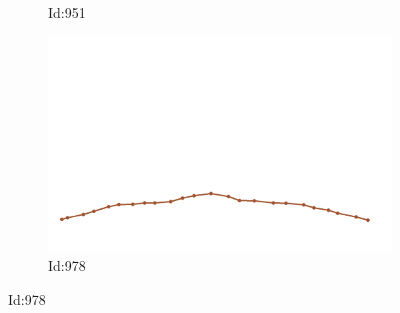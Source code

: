 \documentclass[12pt,twoside]{report}
\begin{document}
\begin{figure}
\begin{subfigure}[b]{0.20\textwidth}
\caption{Id:951}
\end{subfigure}
\begin{subfigure}[b]{0.20\textwidth}
\centering
\includegraphics[width=\textwidth]{../trajectories/978.png}
\caption{Id:978}
\end{subfigure}
\end{figure}
\end{document}
